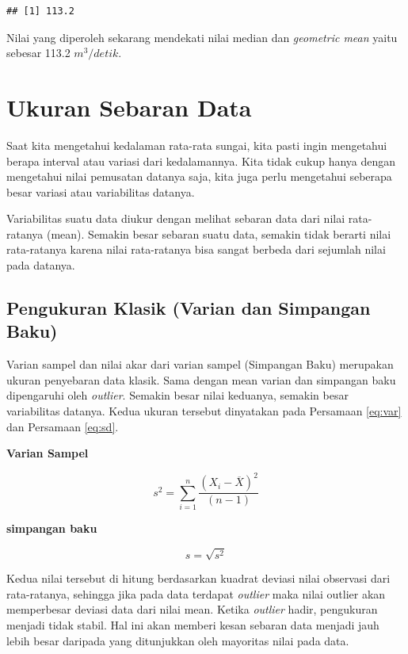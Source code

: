 \documentclass[]{book}
\begin{document}
\begin{verbatim}
## [1] 113.2
\end{verbatim}

Nilai yang diperoleh sekarang mendekati nilai median dan \emph{geometric
mean} yaitu sebesar 113.2 \(m^3/detik\).

\section{Ukuran Sebaran Data}\label{ukuran-sebaran-data}

Saat kita mengetahui kedalaman rata-rata sungai, kita pasti ingin
mengetahui berapa interval atau variasi dari kedalamannya. Kita tidak
cukup hanya dengan mengetahui nilai pemusatan datanya saja, kita juga
perlu mengetahui seberapa besar variasi atau variabilitas datanya.

Variabilitas suatu data diukur dengan melihat sebaran data dari nilai
rata-ratanya (mean). Semakin besar sebaran suatu data, semakin tidak
berarti nilai rata-ratanya karena nilai rata-ratanya bisa sangat berbeda
dari sejumlah nilai pada datanya.

\subsection{Pengukuran Klasik (Varian dan Simpangan
Baku)}\label{pengukuran-klasik-varian-dan-simpangan-baku}

Varian sampel dan nilai akar dari varian sampel (Simpangan Baku)
merupakan ukuran penyebaran data klasik. Sama dengan mean varian dan
simpangan baku dipengaruhi oleh \emph{outlier}. Semakin besar nilai
keduanya, semakin besar variabilitas datanya. Kedua ukuran tersebut
dinyatakan pada Persamaan \eqref{eq:var} dan Persamaan \eqref{eq:sd}.

\textbf{Varian Sampel}

\begin{equation}
  s^2=\sum_{i=1}^n\frac{\left(X_i-\overline{X}\right)^2}{\left(n-1\right)}
  \label{eq:var}
\end{equation}

\textbf{simpangan baku}

\begin{equation}
  s=\sqrt{s^2}
  \label{eq:sd}
\end{equation}

Kedua nilai tersebut di hitung berdasarkan kuadrat deviasi nilai
observasi dari rata-ratanya, sehingga jika pada data terdapat
\emph{outlier} maka nilai outlier akan memperbesar deviasi data dari
nilai mean. Ketika \emph{outlier} hadir, pengukuran menjadi tidak
stabil. Hal ini akan memberi kesan sebaran data menjadi jauh lebih besar
daripada yang ditunjukkan oleh mayoritas nilai pada data.
\end{document}
